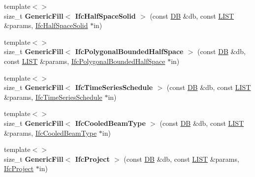 \begin{DoxyCompactItemize}
\item 
\hypertarget{namespace_assimp_1_1_s_t_e_p_aff65ed81ed63dc9dccd36187634f6b10}{{\footnotesize template$<$$>$ }\\size\+\_\+t {\bfseries Generic\+Fill$<$ Ifc\+Half\+Space\+Solid $>$} (const \hyperlink{class_assimp_1_1_s_t_e_p_1_1_d_b}{D\+B} \&db, const \hyperlink{class_assimp_1_1_s_t_e_p_1_1_e_x_p_r_e_s_s_1_1_l_i_s_t}{L\+I\+S\+T} \&params, \hyperlink{struct_assimp_1_1_i_f_c_1_1_ifc_half_space_solid}{Ifc\+Half\+Space\+Solid} $\ast$in)}\label{namespace_assimp_1_1_s_t_e_p_aff65ed81ed63dc9dccd36187634f6b10}

\item 
\hypertarget{namespace_assimp_1_1_s_t_e_p_a968110a8f0394c3a2e5b07475b899b86}{{\footnotesize template$<$$>$ }\\size\+\_\+t {\bfseries Generic\+Fill$<$ Ifc\+Polygonal\+Bounded\+Half\+Space $>$} (const \hyperlink{class_assimp_1_1_s_t_e_p_1_1_d_b}{D\+B} \&db, const \hyperlink{class_assimp_1_1_s_t_e_p_1_1_e_x_p_r_e_s_s_1_1_l_i_s_t}{L\+I\+S\+T} \&params, \hyperlink{struct_assimp_1_1_i_f_c_1_1_ifc_polygonal_bounded_half_space}{Ifc\+Polygonal\+Bounded\+Half\+Space} $\ast$in)}\label{namespace_assimp_1_1_s_t_e_p_a968110a8f0394c3a2e5b07475b899b86}

\item 
\hypertarget{namespace_assimp_1_1_s_t_e_p_a67f8394a4344acecceea99685b3961f7}{{\footnotesize template$<$$>$ }\\size\+\_\+t {\bfseries Generic\+Fill$<$ Ifc\+Time\+Series\+Schedule $>$} (const \hyperlink{class_assimp_1_1_s_t_e_p_1_1_d_b}{D\+B} \&db, const \hyperlink{class_assimp_1_1_s_t_e_p_1_1_e_x_p_r_e_s_s_1_1_l_i_s_t}{L\+I\+S\+T} \&params, \hyperlink{struct_assimp_1_1_i_f_c_1_1_ifc_time_series_schedule}{Ifc\+Time\+Series\+Schedule} $\ast$in)}\label{namespace_assimp_1_1_s_t_e_p_a67f8394a4344acecceea99685b3961f7}

\item 
\hypertarget{namespace_assimp_1_1_s_t_e_p_a3177e3c59409a123475309bfae3d9f95}{{\footnotesize template$<$$>$ }\\size\+\_\+t {\bfseries Generic\+Fill$<$ Ifc\+Cooled\+Beam\+Type $>$} (const \hyperlink{class_assimp_1_1_s_t_e_p_1_1_d_b}{D\+B} \&db, const \hyperlink{class_assimp_1_1_s_t_e_p_1_1_e_x_p_r_e_s_s_1_1_l_i_s_t}{L\+I\+S\+T} \&params, \hyperlink{struct_assimp_1_1_i_f_c_1_1_ifc_cooled_beam_type}{Ifc\+Cooled\+Beam\+Type} $\ast$in)}\label{namespace_assimp_1_1_s_t_e_p_a3177e3c59409a123475309bfae3d9f95}

\item 
\hypertarget{namespace_assimp_1_1_s_t_e_p_a136f3db9f05b46f228f4126e54097fab}{{\footnotesize template$<$$>$ }\\size\+\_\+t {\bfseries Generic\+Fill$<$ Ifc\+Project $>$} (const \hyperlink{class_assimp_1_1_s_t_e_p_1_1_d_b}{D\+B} \&db, const \hyperlink{class_assimp_1_1_s_t_e_p_1_1_e_x_p_r_e_s_s_1_1_l_i_s_t}{L\+I\+S\+T} \&params, \hyperlink{struct_assimp_1_1_i_f_c_1_1_ifc_project}{Ifc\+Project} $\ast$in)}\label{namespace_assimp_1_1_s_t_e_p_a136f3db9f05b46f228f4126e54097fab}


\end{DoxyCompactItemize}
